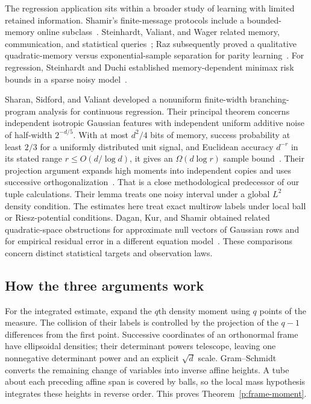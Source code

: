The regression application sits within a broader study of learning with
limited retained information. Shamir's finite-message protocols include a
bounded-memory online subclass~\cite[Section~2]{Shamir2014}.
Steinhardt, Valiant, and Wager related memory, communication, and statistical
queries~\cite[Section~1.1]{SVW2016}; Raz subsequently proved a qualitative
quadratic-memory versus exponential-sample separation for parity
learning~\cite[Theorem~1]{Raz2016}. For regression, Steinhardt and Duchi
established memory-dependent minimax risk bounds in a sparse noisy
model~\cite[Section~1.1]{SteinhardtDuchi2015}.

Sharan, Sidford, and Valiant developed a nonuniform finite-width
branching-program analysis for continuous regression. Their principal
theorem concerns independent isotropic Gaussian features with independent
uniform additive noise of half-width \(2^{-d/5}\). With at most \(d^2/4\)
bits of memory, success probability at least \(2/3\) for a uniformly
distributed unit signal, and Euclidean accuracy
\(d^{-r}\) in its stated range \(r\le O(d/\log d)\), it gives an
\(\Omega(d\log r)\) sample bound~\cite[Theorem~1]{SSV2019}.
Their projection argument expands high moments into independent copies
and uses successive orthogonalization~\cite[Section~7, Lemma~12]{SSV2019}.
That is a close methodological predecessor of our tuple calculations.
Their lemma treats one noisy interval under a global \(L^2\) density
condition. The estimates here treat exact multirow labels under local
ball or Riesz-potential conditions. Dagan, Kur, and Shamir obtained related
quadratic-space obstructions for approximate null vectors of Gaussian
rows and for empirical residual error in a different equation
model~\cite[Theorems~3 and~10]{DKS2019}. These comparisons concern
distinct statistical targets and observation laws.

\subsection{How the three arguments work}

For the integrated estimate, expand the \(q\)th density moment using
\(q\) points of the measure. The collision of their labels is controlled
by the projection of the \(q-1\) differences from the first point.
Successive coordinates of an orthonormal frame have ellipsoidal densities;
their determinant powers telescope, leaving one nonnegative determinant
power and an explicit \(\sqrt d\) scale. Gram--Schmidt converts the
remaining change of variables into inverse affine heights. A tube about
each preceding affine span is covered by balls, so the local mass
hypothesis integrates these heights in reverse order. This proves
Theorem~\ref{p:frame-moment}.

